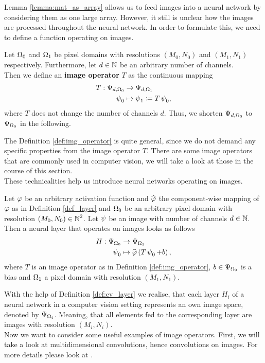 Lemma \ref{lemma:mat_as_array} allows us to feed images into a neural network by considering them as one large array. However, it still is unclear how the images are processed throughout the neural network. In order to formulate this, we need to define a function operating on images.

\begin{definition}\label{def:img_operator}
Let $\Omega_0$ and $\Omega_1$ be pixel domains with resolutions $(M_0,N_0)$ and $(M_1,N_1)$ respectively. Furthermore, let $d\in\operatorname{\mathbb{N}}$ be an arbitrary number of channels.\\
Then we define an \textbf{image operator} $T$ as the continuous mapping
\begin{align*}
T: \Psi_{d,\Omega_0} &\to \Psi_{d,\Omega_1}\\
\operatorname{\psi}_0 &\mapsto \operatorname{\psi}_1 \coloneqq T \operatorname{\psi}_0,
\end{align*}
where $T$ does not change the number of channels $d$. Thus, we shorten $\Psi_{d,\Omega_0}$ to $\Psi_{\Omega_0}$ in the following.
\end{definition}

The Definition \ref{def:img_operator} is quite general, since we do not demand any specific properties from the image operator $T$. There are some image operators that are commonly used in computer vision, we will take a look at those in the course of this section.\\
These technicalities help us introduce neural networks operating on images.

\begin{definition}\label{def:cv_layer}
Let $\operatorname{\varphi}$ be an arbitrary activation function and $\widehat{\operatorname{\varphi}}$ the component-wise mapping of $\operatorname{\varphi}$ as in Definition \ref{def_layer} and $\Omega_0$ be an arbitrary pixel domain with resolution $(M_0,N_0)\in\operatorname{\mathbb{N}}^2$. Let $\operatorname{\psi}$ be an image with number of channels $d\in\operatorname{\mathbb{N}}$.\\
Then a neural layer that operates on images looks as follows
\begin{align*}
H: \Psi_{\Omega_0} &\to \Psi_{\Omega_1}\\
\operatorname{\psi}_0 &\mapsto \widehat{\operatorname{\varphi}}\left(T\operatorname{\psi}_0 + b\right),
\end{align*}
where $T$ is an image operator as in Definition \ref{def:img_operator}, $b\in\Psi_{\Omega_0}$ is a bias and $\Omega_1$ a pixel domain with resolution $(M_1,N_1)$.
\end{definition}

With the help of Definition \ref{def:cv_layer} we realise, that each layer $H_i$ of a neural network in a computer vision setting represents an own image space, denoted by $\Psi_{\Omega_i}$. Meaning, that all elements fed to the corresponding layer are images with resolution $(M_i,N_i)$.\\
Now we want to consider some useful examples of image operators. First, we will take a look at multidimensional convolutions, hence convolutions on images. For more details please look at \cite[Chapter~9]{goodfellow2016deep}.

